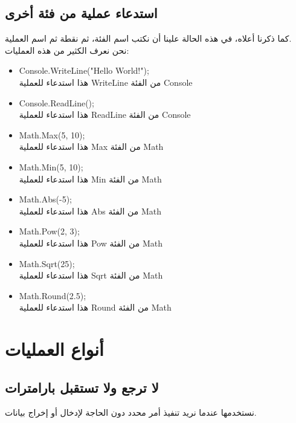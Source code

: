 \documentclass[12pt]{article}
\begin{document}
\subsection*{استدعاء عملية من فئة أخرى}
كما ذكرنا أعلاه، في هذه الحالة علينا أن نكتب اسم الفئة، ثم نقطة ثم اسم العملية. \\
نحن نعرف الكثير من هذه العمليات:
\begin{itemize}
    \item \textenglish{Console.WriteLine("Hello World!");} \\
    هذا استدعاء للعملية \textenglish{WriteLine} من الفئة \textenglish{Console}
    \item \textenglish{Console.ReadLine();} \\
    هذا استدعاء للعملية \textenglish{ReadLine} من الفئة \textenglish{Console}
    \item \textenglish{Math.Max(5, 10);} \\
    هذا استدعاء للعملية \textenglish{Max} من الفئة \textenglish{Math}
    \item \textenglish{Math.Min(5, 10);} \\
    هذا استدعاء للعملية \textenglish{Min} من الفئة \textenglish{Math}
    \item \textenglish{Math.Abs(-5); } \\
    هذا استدعاء للعملية \textenglish{Abs} من الفئة \textenglish{Math}
    \item \textenglish{Math.Pow(2, 3); } \\
    هذا استدعاء للعملية \textenglish{Pow} من الفئة \textenglish{Math}
    \item \textenglish{Math.Sqrt(25); } \\
    هذا استدعاء للعملية \textenglish{Sqrt} من الفئة \textenglish{Math}
    \item \textenglish{Math.Round(2.5); } \\
    هذا استدعاء للعملية \textenglish{Round} من الفئة \textenglish{Math}
\end{itemize}

\clearpage
\section{أنواع العمليات}

\subsection{لا ترجع ولا تستقبل بارامترات}
نستخدمها عندما نريد تنفيذ أمر محدد دون الحاجة لإدخال أو إخراج بيانات.
\end{document}
